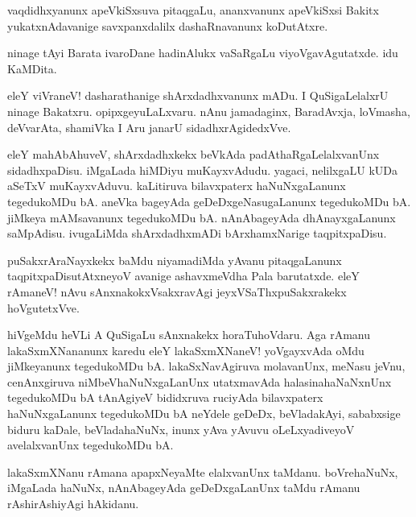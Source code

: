 \begin{mng}
vaqdidhxyanunx apeVkiSxsuva pitaqgaLu, ananxvanunx apeVkiSxsi Bakitx yukatxnAdavanige savxpanxdalilx dashaRnavanunx koDutAtxre.
\end{mng}

\begin{mng}
ninage tAyi Barata ivaroDane hadinAlukx vaSaRgaLu viyoVgavAgutatxde. idu KaMDita.
\end{mng}

\begin{mng}
eleY viVraneV! dasharathanige shArxdadhxvanunx mADu. I QuSigaLelalxrU ninage Bakatxru. opipxgeyuLaLxvaru. nAnu jamadaginx, BaradAvxja, loVmasha, deVvarAta, shamiVka I Aru janarU sidadhxrAgidedxVve.
\end{mng}

\begin{mng}
eleY mahAbAhuveV, shArxdadhxkekx beVkAda padAthaRgaLelalxvanUnx sidadhxpaDisu. iMgaLada hiMDiyu muKayxvAdudu. yagaci, nelilxgaLU kUDa aSeTxV muKayxvAduvu. kaLitiruva bilavxpaterx haNuNxgaLanunx tegedukoMDu bA. aneVka bageyAda geDeDxgeNasugaLanunx tegedukoMDu bA. jiMkeya mAMsavanunx tegedukoMDu bA. nAnAbageyAda dhAnayxgaLanunx saMpAdisu. ivugaLiMda shArxdadhxmADi bArxhamxNarige taqpitxpaDisu.
\end{mng}

\begin{mng}
puSakxrAraNayxkekx baMdu niyamadiMda yAvanu pitaqgaLanunx taqpitxpaDisutAtxneyoV avanige ashavxmeVdha Pala barutatxde. eleY rAmaneV! nAvu sAnxnakokxVsakxravAgi jeyxVSaThxpuSakxrakekx hoVgutetxVve.
\end{mng}

\begin{mng}
hiVgeMdu heVLi A QuSigaLu sAnxnakekx horaTuhoVdaru. Aga rAmanu lakaSxmXNananunx karedu eleY lakaSxmXNaneV! yoVgayxvAda oMdu jiMkeyanunx tegedukoMDu bA. lakaSxNavAgiruva molavanUnx, meNasu jeVnu, cenAnxgiruva niMbeVhaNuNxgaLanUnx utatxmavAda halasinahaNaNxnUnx tegedukoMDu bA tAnAgiyeV bididxruva ruciyAda bilavxpaterx haNuNxgaLanunx tegedukoMDu bA neYdele geDeDx, beVladakAyi, sababxsige biduru kaDale, beVladahaNuNx, inunx yAva yAvuvu oLeLxyadiveyoV avelalxvanUnx tegedukoMDu bA.
\end{mng}

\begin{mng}
lakaSxmXNanu rAmana apapxNeyaMte elalxvanUnx taMdanu. boVrehaNuNx, iMgaLada haNuNx, nAnAbageyAda geDeDxgaLanUnx taMdu rAmanu rAshirAshiyAgi hAkidanu.
\end{mng}


